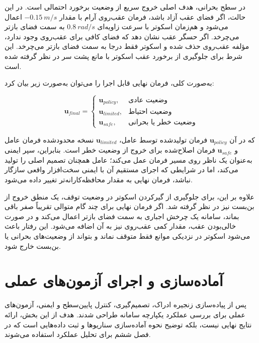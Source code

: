 در سطح بحرانی، هدف اصلی خروج سریع از وضعیت برخورد احتمالی است. در این حالت، اگر فضای عقب آزاد باشد، فرمان عقب‌روی آرام با مقدار $-0.15~m/s$ اعمال می‌شود و هم‌زمان اسکوتر با سرعت زاویه‌ای $0.8~rad/s$ به سمت فضای بازتر می‌چرخد. اگر حسگر عقب نشان دهد که فضای کافی برای عقب‌روی وجود ندارد، مؤلفه عقب‌روی حذف شده و اسکوتر فقط درجا به سمت فضای بازتر می‌چرخد. این شرط برای جلوگیری از برخورد عقب اسکوتر با مانع پشت سر در نظر گرفته شده است.

به‌صورت کلی، فرمان نهایی قابل اجرا را می‌توان به‌صورت زیر بیان کرد:

\begin{equation}
	\mathbf{u}_{final} =
	\begin{cases}
		\mathbf{u}_{policy}, & \text{وضعیت عادی} \\
		\mathbf{u}_{limited}, & \text{وضعیت احتیاط} \\
		\mathbf{u}_{safe}, & \text{وضعیت خطر یا بحرانی}
	\end{cases}
	\label{eq:real_safe_command_selection}
\end{equation}

که در آن $\mathbf{u}_{policy}$ فرمان تولیدشده توسط عامل، $\mathbf{u}_{limited}$ نسخه محدودشده فرمان عامل و $\mathbf{u}_{safe}$ فرمان اصلاح‌شده برای خروج از وضعیت خطر است. بنابراین، سپر ایمنی به‌عنوان یک ناظر روی مسیر فرمان عمل می‌کند؛ عامل همچنان تصمیم اصلی را تولید می‌کند، اما در شرایطی که اجرای مستقیم آن با ایمنی سخت‌افزار واقعی سازگار نباشد، فرمان نهایی به مقدار محافظه‌کارانه‌تر تغییر داده می‌شود.

علاوه بر این، برای جلوگیری از گیرکردن اسکوتر در وضعیت توقف، یک منطق خروج از بن‌بست نیز در نظر گرفته شد. اگر فرمان نهایی برای چند گام متوالی تقریباً صفر باقی بماند، سامانه یک چرخش اجباری به سمت فضای بازتر اعمال می‌کند و در صورت خالی‌بودن عقب، مقدار کمی عقب‌روی نیز به آن اضافه می‌شود. این رفتار باعث می‌شود اسکوتر در نزدیکی موانع فقط متوقف نماند و بتواند از وضعیت‌های بحرانی یا بن‌بست خارج شود.

\section{آماده‌سازی و اجرای آزمون‌های عملی}
\label{sec:real_test_preparation_and_execution}

پس از پیاده‌سازی زنجیره ادراک، تصمیم‌گیری، کنترل پایین‌سطح و ایمنی، آزمون‌های عملی برای بررسی عملکرد یکپارچه سامانه طراحی شدند. هدف از این بخش، ارائه نتایج نهایی نیست، بلکه توضیح نحوه آماده‌سازی سناریوها و ثبت داده‌هایی است که در فصل ششم برای تحلیل عملکرد استفاده می‌شوند.

